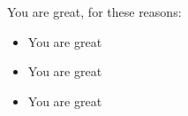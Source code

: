 You are great, for these reasons:
\begin{itemize}
    \item You are great
    \item You are great
    \item You are great
\end{itemize}

